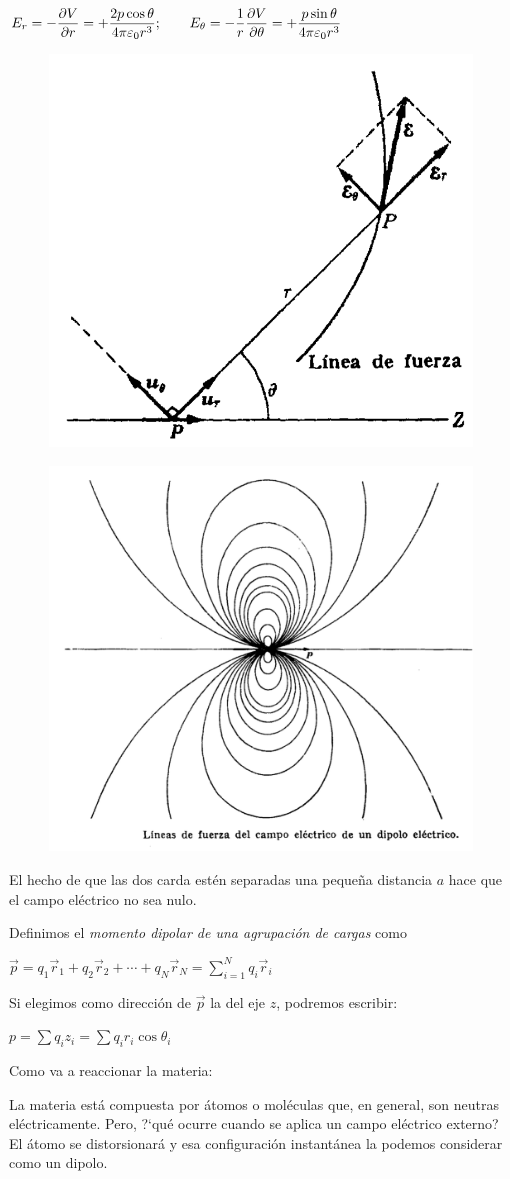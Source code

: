 $\displaystyle E_r=-\pdv{V}{r}= +\dfrac{2p\cos \theta}{4 \pi \varepsilon_0 r^3}; \qquad E_\theta=-\dfrac 1 r \pdv{V}{\theta}= +\dfrac{p\sin \theta}{4 \pi \varepsilon_0 r^3}$
\begin{multicols}{2}
\begin{figure}[H]
	\centering
	\includegraphics[width=.4\textwidth]{imagenes/imagenes24/T24IM03.png}
\end{figure}
\begin{figure}[H]
	\centering
	\includegraphics[width=.4\textwidth]{imagenes/imagenes24/T24IM04.png}
\end{figure}
\end{multicols}
El hecho de que las dos carda estén separadas una pequeña distancia $a$ hace que el campo eléctrico no sea nulo.

Definimos el \emph{momento dipolar de una agrupación de cargas} como 

$\displaystyle \vec p= q_1 \vec r_1+ q_2 \vec r_2+ \cdots + q_N \vec r_N = \sum_{i=1}^N q_i \vec r_i$

Si elegimos como dirección de $\vec p$ la del eje $z$, podremos escribir: 

$p=\sum q_iz_i=\sum q_ir_i \cos \theta_i$ 


Como va a reaccionar la materia:

La materia está compuesta por átomos o moléculas que, en general, son neutras eléctricamente. Pero, ?`qué ocurre cuando se aplica un campo eléctrico externo? El átomo se distorsionará y esa configuración instantánea la podemos considerar como un dipolo.

